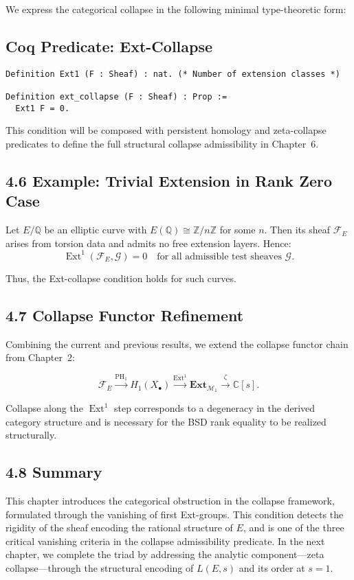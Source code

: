 \documentclass[11pt]{article}
\DeclareMathOperator{\Ext}{Ext}
\DeclareMathOperator{\PH}{PH}
\begin{document}
We express the categorical collapse in the following minimal type-theoretic form:

\subsection*{Coq Predicate: Ext-Collapse}
\begin{lstlisting}[language=Coq]
Definition Ext1 (F : Sheaf) : nat. (* Number of extension classes *)

Definition ext_collapse (F : Sheaf) : Prop :=
  Ext1 F = 0.
\end{lstlisting}

This condition will be composed with persistent homology and zeta-collapse predicates to define the full structural collapse admissibility in Chapter~6.

\subsection*{4.6 Example: Trivial Extension in Rank Zero Case}

Let \( E/\mathbb{Q} \) be an elliptic curve with \( E(\mathbb{Q}) \cong \mathbb{Z}/n\mathbb{Z} \) for some \( n \). Then its sheaf \( \mathcal{F}_E \) arises from torsion data and admits no free extension layers. Hence:
\[
\Ext^1(\mathcal{F}_E, \mathcal{G}) = 0 \quad \text{for all admissible test sheaves } \mathcal{G}.
\]

Thus, the Ext-collapse condition holds for such curves.

\subsection*{4.7 Collapse Functor Refinement}

Combining the current and previous results, we extend the collapse functor chain from Chapter~2:

\[
\mathcal{F}_E
\xrightarrow{\PH_1} H_1(X_\bullet)
\xrightarrow{\Ext^1} \mathbf{Ext}_{\mathcal{M}_1}
\xrightarrow{\zeta} \mathbb{C}[s].
\]

Collapse along the \( \Ext^1 \) step corresponds to a degeneracy in the derived category structure and is necessary for the BSD rank equality to be realized structurally.

\subsection*{4.8 Summary}

This chapter introduces the categorical obstruction in the collapse framework, formulated through the vanishing of first Ext-groups. This condition detects the rigidity of the sheaf encoding the rational structure of \( E \), and is one of the three critical vanishing criteria in the collapse admissibility predicate. In the next chapter, we complete the triad by addressing the analytic component—zeta collapse—through the structural encoding of \( L(E, s) \) and its order at \( s = 1 \).
\end{document}
